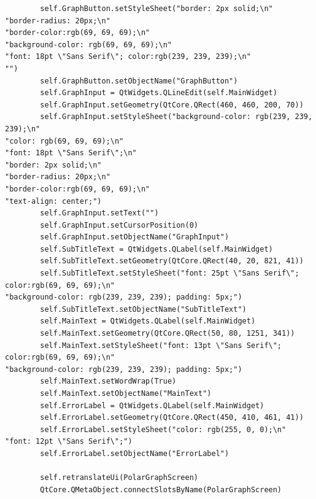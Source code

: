 \documentclass{article}
\begin{document}
\begin{lstlisting}
        self.GraphButton.setStyleSheet("border: 2px solid;\n"
"border-radius: 20px;\n"
"border-color:rgb(69, 69, 69);\n"
"background-color: rgb(69, 69, 69);\n"
"font: 18pt \"Sans Serif\"; color:rgb(239, 239, 239);\n"
"")
        self.GraphButton.setObjectName("GraphButton")
        self.GraphInput = QtWidgets.QLineEdit(self.MainWidget)
        self.GraphInput.setGeometry(QtCore.QRect(460, 460, 200, 70))
        self.GraphInput.setStyleSheet("background-color: rgb(239, 239, 239);\n"
"color: rgb(69, 69, 69);\n"
"font: 18pt \"Sans Serif\";\n"
"border: 2px solid;\n"
"border-radius: 20px;\n"
"border-color:rgb(69, 69, 69);\n"
"text-align: center;")
        self.GraphInput.setText("")
        self.GraphInput.setCursorPosition(0)
        self.GraphInput.setObjectName("GraphInput")
        self.SubTitleText = QtWidgets.QLabel(self.MainWidget)
        self.SubTitleText.setGeometry(QtCore.QRect(40, 20, 821, 41))
        self.SubTitleText.setStyleSheet("font: 25pt \"Sans Serif\"; color:rgb(69, 69, 69);\n"
"background-color: rgb(239, 239, 239); padding: 5px;")
        self.SubTitleText.setObjectName("SubTitleText")
        self.MainText = QtWidgets.QLabel(self.MainWidget)
        self.MainText.setGeometry(QtCore.QRect(50, 80, 1251, 341))
        self.MainText.setStyleSheet("font: 13pt \"Sans Serif\"; color:rgb(69, 69, 69);\n"
"background-color: rgb(239, 239, 239); padding: 5px;")
        self.MainText.setWordWrap(True)
        self.MainText.setObjectName("MainText")
        self.ErrorLabel = QtWidgets.QLabel(self.MainWidget)
        self.ErrorLabel.setGeometry(QtCore.QRect(450, 410, 461, 41))
        self.ErrorLabel.setStyleSheet("color: rgb(255, 0, 0);\n"
"font: 12pt \"Sans Serif\";")
        self.ErrorLabel.setObjectName("ErrorLabel")

        self.retranslateUi(PolarGraphScreen)
        QtCore.QMetaObject.connectSlotsByName(PolarGraphScreen)


\end{lstlisting}
\end{document}
